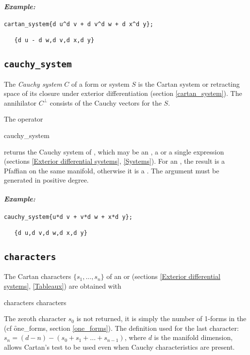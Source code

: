 \paragraph{\it Example:}
\begin{verbatim}
cartan_system{d u^d v + d v^d w + d x^d y};

   {d u - d w,d v,d x,d y}
\end{verbatim}

\subsection{\tt cauchy\_system}
\label{cauchy_system}

The {\em Cauchy system} $C$ of a form or system $S$ is the Cartan system or
retracting space of its closure under exterior differentiation (section
\ref{cartan_system}). The annihilator $C^\perp$ consists of the Cauchy
vectors for the $S$.

The operator
\begin{syntax}
	cauchy\_system 
\end{syntax}
returns the Cauchy system of , which may be an , a
 or a single  expression (sections \ref{Exterior
differential systems}, \ref{Systems}). For an , the result is a
Pfaffian  on the same manifold, otherwise it is a
. The argument must be generated in positive degree.

\paragraph{\it Example:}
\begin{verbatim}
cauchy_system{u*d v + v*d w + x*d y};

   {d u,d v,d w,d x,d y}
\end{verbatim}

\subsection{\tt characters}
\label{characters}

The Cartan characters $\{s_1,...,s_n\}$ of an  or 
(sections \ref{Exterior differential systems}, \ref{Tableaux}) are obtained
with
\begin{syntax}
	characters  \qquad characters 
\end{syntax}
The zeroth character $s_0$ is not returned, it is simply the number of
1-forms in the  (cf \f{one\_forms}, section \ref{one_forms}). The
definition used for the last character: $s_n = (d - n) - (s_0 + s_1 + ... +
s_{n-1})$, where $d$ is the manifold dimension, allows Cartan's test to be
used even when Cauchy characteristics are present.

